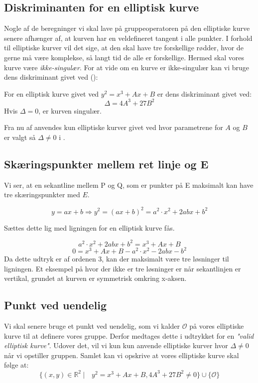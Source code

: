 \subsection{Diskriminanten for en elliptisk kurve}
Nogle af de beregninger vi skal lave på gruppeoperatoren på den elliptiske kurve senere afhænger af, at kurven har en veldefineret tangent i alle punkter. I forhold til elliptiske kurver vil det sige, at den skal have tre forskellige rødder, hvor de gerne må være komplekse, så langt tid de alle er forskellige. Hermed skal vores kurve være \textit{ikke-singulær}. For at vide om en kurve er ikke-singulær kan vi bruge dens diskriminant givet ved (\cite{josephh.silverman2006}):
\begin{mdframed}[frametitle={Kurvens diskriminant}]
For en elliptisk kurve givet ved $y^2=x^3+Ax+B$ er dens diskriminant givet ved:
\begin{equation}\label{eq:diskriminant}
    \Delta = 4A^3+27B^2
\end{equation}
Hvis $\Delta = 0$, er kurven singulær.
\end{mdframed}

Fra nu af anvendes kun elliptiske kurver givet ved  hvor parametrene for $A$ og $B$ er valgt så $\Delta \neq 0$ i .
\subsection{Skæringspunkter mellem ret linje og E}
Vi ser, at en sekantline mellem P og Q, som er punkter på E maksimalt kan have tre skæringspunkter med $E$.

$$y=ax+b \Rightarrow y^2=(ax+b)^2 = a^2 \cdot x^2+2abx+b^2$$

Sættes dette lig med ligningen for en elliptisk kurve  fås.

$$a^2 \cdot x^2 + 2abx + b^2 = x^3 +Ax+B$$
\begin{equation}
    0= x^3 + Ax+ B - a^2 \cdot x^2 - 2abx - b^2
\end{equation}
Da dette udtryk er af ordenen $3$, kan der maksimalt være tre løsninger til ligningen. Et eksempel på hvor der ikke er tre løsninger er når sekantlinjen er vertikal, grundet at kurven er symmetrisk omkring x-aksen. 

\subsection{Punkt ved uendelig}
Vi skal senere bruge et punkt ved uendelig, som vi kalder $\mathcal{O}$ på vores elliptiske kurve til at definere vores gruppe. Derfor medtages dette i udtrykket for en \textit{"valid elliptisk kurve"}. Udover det, vil vi kun  kun anvende elliptiske kurver hvor $\Delta \neq 0$ når vi opstiller gruppen. Samlet kan vi opskrive at vores elliptiske kurve skal følge at:
\begin{equation}\label{eq:ecc}
    \{(x,y) \in \mathbb{R}^2\ | \quad y^2=x^3+Ax+B, 4A^3 + 27B^2 \neq 0 \} \cup \{\mathcal{O}\}
\end{equation}

